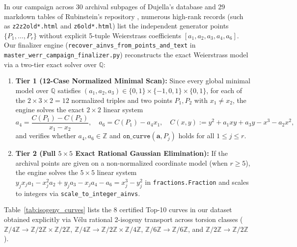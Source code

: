 \documentclass[10pt,a4paper]{article}
\theoremstyle{plain}
\theoremstyle{definition}
\theoremstyle{remark}
\begin{document}
In our campaign across 30 archival subpages of Dujella's database \cite{dujella2024highrank} and 29 markdown tables of Rubinstein's repository \cite{rubinstein2024tables}, numerous high-rank records (such as \texttt{z2z2old*.html} and \texttt{z6old*.html}) list the independent generator points $\{P_1, \dots, P_r\}$ without explicit 5-tuple Weierstrass coefficients $[a_1, a_2, a_3, a_4, a_6]$. Our finalizer engine (\texttt{recover\_ainvs\_from\_points\_and\_text} in \texttt{master\_werr\_campaign\_finalizer.py}) reconstructs the exact Weierstrass model via a two-tier exact solver over $\mathbb{Q}$:
\begin{enumerate}[leftmargin=2em]
    \item \textbf{Tier 1 (12-Case Normalized Minimal Scan):} Since every global minimal model over $\mathbb{Q}$ satisfies $(a_1, a_2, a_3) \in \{0, 1\} \times \{-1, 0, 1\} \times \{0, 1\}$, for each of the $2 \times 3 \times 2 = 12$ normalized triples and two points $P_1, P_2$ with $x_1 \neq x_2$, the engine solves the exact $2 \times 2$ linear system
    \begin{equation}
    a_4 = \frac{C(P_1) - C(P_2)}{x_1 - x_2}, \quad a_6 = C(P_1) - a_4 x_1, \quad C(x, y) := y^2 + a_1 x y + a_3 y - x^3 - a_2 x^2,
    \end{equation}
    and verifies whether $a_4, a_6 \in \mathbb{Z}$ and $\mathtt{on\_curve}(\mathbf{a}, P_j)$ holds for all $1 \le j \le r$.
    \item \textbf{Tier 2 (Full $5 \times 5$ Exact Rational Gaussian Elimination):} If the archival points are given on a non-normalized coordinate model (when $r \ge 5$), the engine solves the $5 \times 5$ linear system $y_j x_j a_1 - x_j^2 a_2 + y_j a_3 - x_j a_4 - a_6 = x_j^3 - y_j^2$ in \texttt{fractions.Fraction} and scales to integers via \texttt{scale\_to\_integer\_ainvs}.
\end{enumerate}

Table~\ref{tab:isogeny_curves} lists the 8 certified Top-10 curves in our dataset obtained explicitly via V\'{e}lu rational 2-isogeny transport across torsion classes ($\mathbb{Z}/4\mathbb{Z} \to \mathbb{Z}/2\mathbb{Z} \times \mathbb{Z}/2\mathbb{Z}$, $\mathbb{Z}/4\mathbb{Z} \to \mathbb{Z}/2\mathbb{Z} \times \mathbb{Z}/4\mathbb{Z}$, $\mathbb{Z}/6\mathbb{Z} \to \mathbb{Z}/6\mathbb{Z}$, and $\mathbb{Z}/2\mathbb{Z} \to \mathbb{Z}/2\mathbb{Z}$).
\end{document}
